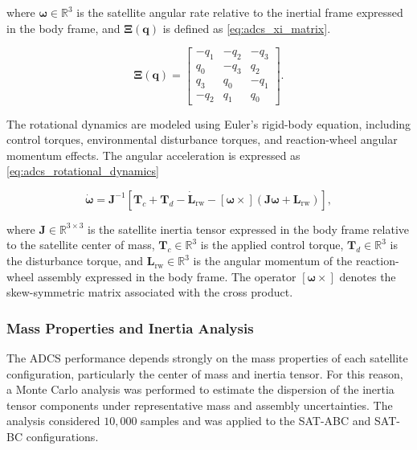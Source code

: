 where \(\boldsymbol{\omega} \in \mathbb{R}^{3}\) is the satellite angular rate relative to the inertial frame expressed in the body frame, and \(\mathbf{\Xi}(\mathbf{q})\) is defined as \eqref{eq:adcs_xi_matrix}.

\begin{equation}
    \mathbf{\Xi}(\mathbf{q}) =
    \begin{bmatrix}
        -q_1 & -q_2 & -q_3 \\
         q_0 & -q_3 &  q_2 \\
         q_3 &  q_0 & -q_1 \\
        -q_2 &  q_1 &  q_0
    \end{bmatrix}.
    \label{eq:adcs_xi_matrix}
\end{equation}

The rotational dynamics are modeled using Euler's rigid-body equation, including control torques, environmental disturbance torques, and reaction-wheel angular momentum effects. The angular acceleration is expressed as \eqref{eq:adcs_rotational_dynamics}

\begin{equation}
    \dot{\boldsymbol{\omega}}
    =
    \mathbf{J}^{-1}
    \left[
        \mathbf{T}_{c}
        + \mathbf{T}_{d}
        - \dot{\mathbf{L}}_{\mathrm{rw}}
        - [\boldsymbol{\omega}\times]
        \left(
            \mathbf{J}\boldsymbol{\omega}
            + \mathbf{L}_{\mathrm{rw}}
        \right)
    \right],
    \label{eq:adcs_rotational_dynamics}
\end{equation}

where \(\mathbf{J} \in \mathbb{R}^{3\times3}\) is the satellite inertia tensor expressed in the body frame relative to the satellite center of mass, \(\mathbf{T}_{c} \in \mathbb{R}^{3}\) is the applied control torque, \(\mathbf{T}_{d} \in \mathbb{R}^{3}\) is the disturbance torque, and \(\mathbf{L}_{\mathrm{rw}} \in \mathbb{R}^{3}\) is the angular momentum of the reaction-wheel assembly expressed in the body frame. The operator \([\boldsymbol{\omega}\times]\) denotes the skew-symmetric matrix associated with the cross product.

\subsubsection{Mass Properties and Inertia Analysis}
\label{subsub:adcs_mass_properties}
The ADCS performance depends strongly on the mass properties of each satellite configuration, particularly the center of mass and inertia tensor. For this reason, a Monte Carlo analysis was performed to estimate the dispersion of the inertia tensor components under representative mass and assembly uncertainties. The analysis considered \(10{,}000\) samples and was applied to the SAT-ABC and SAT-BC configurations.

